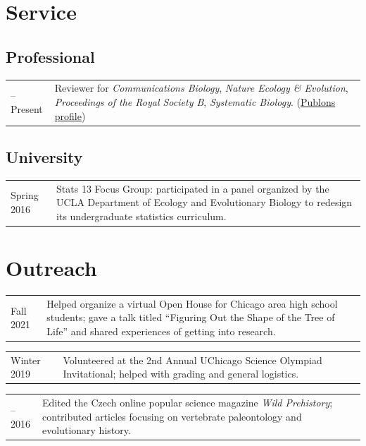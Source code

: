 \documentclass[10pt]{article}
\begin{document}
\section*{Service}

\subsection*{Professional}

\begin{tabularx}{\textwidth}{>{\raggedleft\arraybackslash}p{2.2cm} X}
2019--Present & Reviewer for \textit{Communications Biology}, \textit{Nature Ecology \& Evolution}, \textit{Proceedings of the Royal Society B}, \textit{Systematic Biology}. (\href{https://publons.com/a/3033367}{Publons profile})
\end{tabularx}

\subsection*{University}

\begin{tabularx}{\textwidth}{>{\raggedleft\arraybackslash}p{2.2cm} X}
Spring 2016 & Stats 13 Focus Group: participated in a panel organized by the UCLA Department of Ecology and Evolutionary Biology to redesign its undergraduate statistics curriculum.
\end{tabularx}

\section*{Outreach}

\begin{tabularx}{\textwidth}{>{\raggedleft\arraybackslash}p{2.2cm} X}
Fall 2021 & Helped organize a virtual Open House for Chicago area high school students; gave a talk titled ``Figuring Out the Shape of the Tree of Life'' and shared experiences of getting into research.
\end{tabularx}
\begin{tabularx}{\textwidth}{>{\raggedleft\arraybackslash}p{2.2cm} X}
Winter 2019 & Volunteered at the 2nd Annual UChicago Science Olympiad Invitational; helped with grading and general logistics.
\end{tabularx}
\begin{tabularx}{\textwidth}{>{\raggedleft\arraybackslash}p{2.2cm} X}
2015--2016 & Edited the Czech online popular science magazine \textit{Wild Prehistory}; contributed articles focusing on vertebrate paleontology and evolutionary history.
\end{tabularx}
\end{document}

